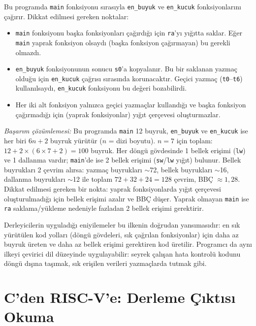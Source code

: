 \begin{ornek}[4.15]
Bu programda \texttt{main} fonksiyonu sırasıyla \texttt{en\_buyuk} ve \texttt{en\_kucuk} fonksiyonlarını çağırır. Dikkat edilmesi gereken noktalar:
\begin{itemize}
\item \texttt{main} fonksiyonu başka fonksiyonları çağırdığı için \texttt{ra}'yı yığıtta saklar. Eğer \texttt{main} yaprak fonksiyon olsaydı (başka fonksiyon çağırmayan) bu gerekli olmazdı.
\item \texttt{en\_buyuk} fonksiyonunun sonucu \texttt{s0}'a kopyalanır. Bu bir saklanan yazmaç olduğu için \texttt{en\_kucuk} çağrısı sırasında korunacaktır. Geçici yazmaç (\texttt{t0}--\texttt{t6}) kullanılsaydı, \texttt{en\_kucuk} fonksiyonu bu değeri bozabilirdi.
\item Her iki alt fonksiyon yalnızca geçici yazmaçlar kullandığı ve başka fonksiyon çağırmadığı için (yaprak fonksiyonlar) yığıt çerçevesi oluşturmazlar.
\end{itemize}

\emph{Başarım çözümlemesi:} Bu programda \texttt{main} 12 buyruk, \texttt{en\_buyuk} ve \texttt{en\_kucuk} ise her biri $6n + 2$ buyruk yürütür ($n$ = dizi boyutu). $n = 7$ için toplam: $12 + 2 \times (6 \times 7 + 2) = 100$ buyruk. Her döngü gövdesinde 1 bellek erişimi (\texttt{lw}) ve 1 dallanma vardır; \texttt{main}'de ise 2 bellek erişimi (\texttt{sw}/\texttt{lw} yığıt) bulunur. Bellek buyrukları 2 çevrim alırsa: yazmaç buyrukları $\sim$72, bellek buyrukları $\sim$16, dallanma buyrukları $\sim$12 ile toplam $72 + 32 + 24 = 128$ çevrim, BBÇ $\approx 1{,}28$. Dikkat edilmesi gereken bir nokta: yaprak fonksiyonlarda yığıt çerçevesi oluşturulmadığı için bellek erişimi azalır ve BBÇ düşer. Yaprak olmayan \texttt{main} ise \texttt{ra} saklama/yükleme nedeniyle fazladan 2 bellek erişimi gerektirir.
\end{ornek}


\begin{tanim}
Derleyicilerin uyguladığı eniyilemeler bu ilkenin doğrudan yansımasıdır: en sık yürütülen kod yolları (döngü gövdeleri, sık çağrılan fonksiyonlar) için daha az buyruk üreten ve daha az bellek erişimi gerektiren kod üretilir. Programcı da aynı ilkeyi çevirici dil düzeyinde uygulayabilir: seyrek çalışan hata kontrolü kodunu döngü dışına taşımak, sık erişilen verileri yazmaçlarda tutmak gibi.
\end{tanim}

\section{C'den RISC-V'e: Derleme Çıktısı Okuma}
\label{sec:derleme-ciktisi}

